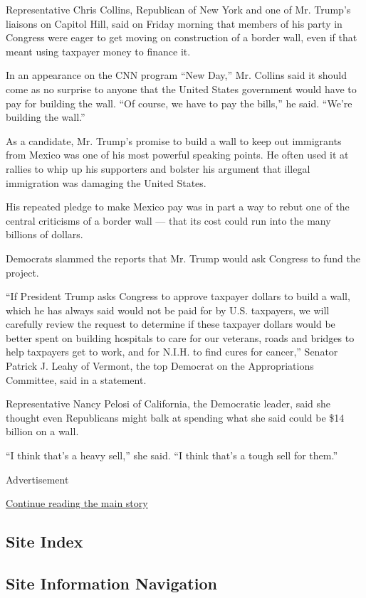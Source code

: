 Representative Chris Collins, Republican of New York and one of Mr.
Trump's liaisons on Capitol Hill, said on Friday morning that members of
his party in Congress were eager to get moving on construction of a
border wall, even if that meant using taxpayer money to finance it.

In an appearance on the CNN program ``New Day,'' Mr. Collins said it
should come as no surprise to anyone that the United States government
would have to pay for building the wall. ``Of course, we have to pay the
bills,'' he said. ``We're building the wall.''

As a candidate, Mr. Trump's promise to build a wall to keep out
immigrants from Mexico was one of his most powerful speaking points. He
often used it at rallies to whip up his supporters and bolster his
argument that illegal immigration was damaging the United States.

His repeated pledge to make Mexico pay was in part a way to rebut one of
the central criticisms of a border wall --- that its cost could run into
the many billions of dollars.

Democrats slammed the reports that Mr. Trump would ask Congress to fund
the project.

``If President Trump asks Congress to approve taxpayer dollars to build
a wall, which he has always said would not be paid for by U.S.
taxpayers, we will carefully review the request to determine if these
taxpayer dollars would be better spent on building hospitals to care for
our veterans, roads and bridges to help taxpayers get to work, and for
N.I.H. to find cures for cancer,'' Senator Patrick J. Leahy of Vermont,
the top Democrat on the Appropriations Committee, said in a statement.

Representative Nancy Pelosi of California, the Democratic leader, said
she thought even Republicans might balk at spending what she said could
be \$14 billion on a wall.

``I think that's a heavy sell,'' she said. ``I think that's a tough sell
for them.''

Advertisement

\protect\hyperlink{after-bottom}{Continue reading the main story}

\hypertarget{site-index}{%
\subsection{Site Index}\label{site-index}}

\hypertarget{site-information-navigation}{%
\subsection{Site Information
Navigation}\label{site-information-navigation}}

